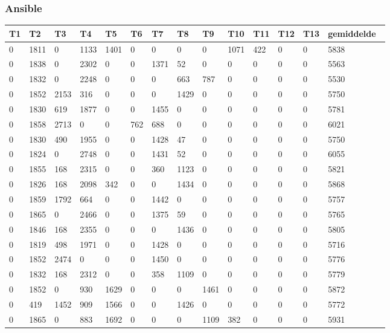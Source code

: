 \subsubsection{Ansible}
\begin{tabular}{ | l | l | l | l | l | l | l | l | l | l | l | l | l | |l | }
\hline
	T1 & T2 & T3 & T4 & T5 & T6 & T7 & T8 & T9 & T10 & T11 & T12 & T13 & gemiddelde\  \\ \hline
	0 & 1811 & 0 & 1133 & 1401 & 0 & 0 & 0 & 0 & 1071 & 422 & 0 & 0 & 5838 \\ \hline
	0 & 1838 & 0 & 2302 & 0 & 0 & 1371 & 52 & 0 & 0 & 0 & 0 & 0 & 5563  \\ \hline
	0 & 1832 & 0 & 2248 & 0 & 0 & 0 & 663 & 787 & 0 & 0 & 0 & 0 & 5530 \\ \hline
	0 & 1852 & 2153 & 316 & 0 & 0 & 0 & 1429 & 0 & 0 & 0 & 0 & 0 & 5750 \\ \hline
	0 & 1830 & 619 & 1877 & 0 & 0 & 1455 & 0 & 0 & 0 & 0 & 0 & 0 & 5781 \\ \hline
	0 & 1858 & 2713 & 0 & 0 & 762 & 688 & 0 & 0 & 0 & 0 & 0 & 0 & 6021 \\ \hline
	0 & 1830 & 490 & 1955 & 0 & 0 & 1428 & 47 & 0 & 0 & 0 & 0 & 0 & 5750 \\ \hline
	0 & 1824 & 0 & 2748 & 0 & 0 & 1431 & 52 & 0 & 0 & 0 & 0 & 0 & 6055 \\ \hline
	0 & 1855 & 168 & 2315 & 0 & 0 & 360 & 1123 & 0 & 0 & 0 & 0 & 0 & 5821 \\ \hline
	0 & 1826 & 168 & 2098 & 342 & 0 & 0 & 1434 & 0 & 0 & 0 & 0 & 0 & 5868 \\ \hline
	0 & 1859 & 1792 & 664 & 0 & 0 & 1442 & 0 & 0 & 0 & 0 & 0 & 0 & 5757 \\ \hline
	0 & 1865 & 0 & 2466 & 0 & 0 & 1375 & 59 & 0 & 0 & 0 & 0 & 0 & 5765 \\ \hline
	0 & 1846 & 168 & 2355 & 0 & 0 & 0 & 1436 & 0 & 0 & 0 & 0 & 0 & 5805 \\ \hline
	0 & 1819 & 498 & 1971 & 0 & 0 & 1428 & 0 & 0 & 0 & 0 & 0 & 0 & 5716 \\ \hline
	0 & 1852 & 2474 & 0 & 0 & 0 & 1450 & 0 & 0 & 0 & 0 & 0 & 0 & 5776 \\ \hline
	0 & 1832 & 168 & 2312 & 0 & 0 & 358 & 1109 & 0 & 0 & 0 & 0 & 0 & 5779 \\ \hline
	0 & 1852 & 0 & 930 & 1629 & 0 & 0 & 0 & 1461 & 0 & 0 & 0 & 0 & 5872 \\ \hline
	0 & 419 & 1452 & 909 & 1566 & 0 & 0 & 1426 & 0 & 0 & 0 & 0 & 0 & 5772 \\ \hline
	0 & 1865 & 0 & 883 & 1692 & 0 & 0 & 0 & 1109 & 382 & 0 & 0 & 0 & 5931 \\ \hline

\end{tabular}
